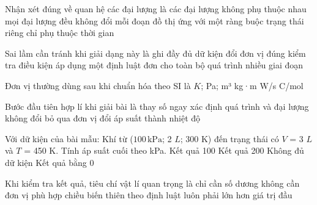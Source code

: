 \begin{ex}
Nhận xét đúng về quan hệ các đại lượng là
\choice
{các đại lượng không phụ thuộc nhau}
{mọi đại lượng đều không đổi}
{\True mỗi đoạn đồ thị ứng với một ràng buộc trạng thái riêng}
{chỉ phụ thuộc thời gian}
\end{ex}

\begin{ex}
Sai lầm cần tránh khi giải dạng này là
\choice
{ghi đầy đủ dữ kiện}
{đổi đơn vị đúng}
{kiểm tra điều kiện}
{\True áp dụng một định luật đơn cho toàn bộ quá trình nhiều giai đoạn}
\end{ex}

\begin{ex}
Đơn vị thường dùng sau khi chuẩn hóa theo SI là
\choice
{\True $K$; Pa; m³}
{kg·m}
{W/s}
{C/mol}
\end{ex}

\begin{ex}
Bước đầu tiên hợp lí khi giải bài là
\choice
{thay số ngay}
{\True xác định quá trình và đại lượng không đổi}
{bỏ qua đơn vị}
{đổi áp suất thành nhiệt độ}
\end{ex}

\begin{ex}
Với dữ kiện của bài mẫu: Khí từ ($100\,\text{kPa}$; 2 $L$; 300 K) đến trạng thái có $V$ = 3 $L$ và $T$ = 450 K. Tính áp suất cuối theo kPa.
\choice
{\True Kết quả 100}
{Kết quả 200}
{Không đủ dữ kiện}
{Kết quả bằng 0}
\end{ex}

\begin{ex}
Khi kiểm tra kết quả, tiêu chí vật lí quan trọng là
\choice
{chỉ cần số dương}
{không cần đơn vị}
{\True phù hợp chiều biến thiên theo định luật}
{luôn phải lớn hơn giá trị đầu}
\end{ex}

